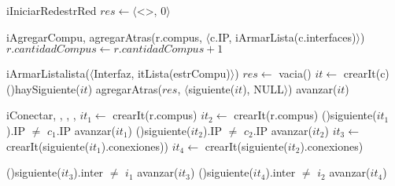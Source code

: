 \begin{Algoritmos}

  
  \begin{algoritmo}{iIniciarRed}{}{estrRed}{
    $res \gets \langle$<>, 0$\rangle$ 
  }
  \end{algoritmo}

  \begin{algoritmo}{iAgregarCompu}{, }{}
    agregarAtras(r.compus, $\langle$c.IP, iArmarLista(c.interfaces)$\rangle$)
    $r.cantidadCompus \gets r.cantidadCompus+1$ 
  \end{algoritmo}
  
  \begin{algoritmo}{iArmarLista}{}{lista($\langle$Interfaz, itLista(estrCompu)$\rangle$)}
    $res \gets$ vacia()
     $it \gets$ crearIt(c)
    \While(){haySiguiente($it$)}{
      agregarAtras($res$, $\langle$siguiente($it$), NULL$\rangle$)
      avanzar($it$)
    }
  \end{algoritmo}
  
  \begin{algoritmo}{iConectar}{, , , , }{}
     $it_{1} \gets$ crearIt(r.compus)
     $it_{2} \gets$ crearIt(r.compus)
    \While(){siguiente($it_{1}$).IP $\neq$ $c_{1}$.IP}{
      avanzar($it_{1}$)
    }
   \While(){siguiente($it_{2}$).IP $\neq$ $c_{2}$.IP}{
      avanzar($it_{2}$)
    }
     $it_{3} \gets$ crearIt(siguiente($it_{1}$).conexiones))
     $it_{4} \gets$ crearIt(siguiente($it_{2}$).conexiones)
    
   \While(){siguiente($it_{3}$).inter $\neq$ $i_{1}$}{
      avanzar($it_{3}$)
    }
   \While(){siguiente($it_{4}$).inter $\neq$ $i_{2}$}{
      avanzar($it_{4}$)
    }


\end{algoritmo}
\end{Algoritmos}
